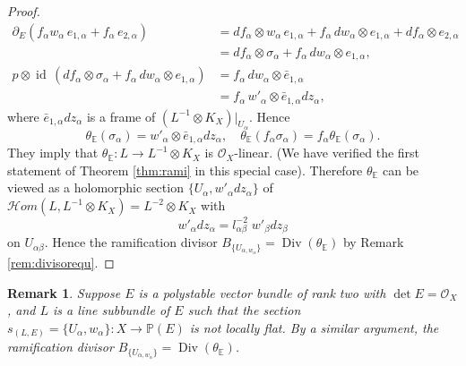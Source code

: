 \documentclass[12pt]{article}
\newtheorem{rem}{Remark}[section]
\begin{document}
\begin{proof}
\begin{align*}
\partial_{E} (f_{\alpha}w_{\alpha} \, e_{1, \alpha} + f_{\alpha} \, e_{2, \alpha}) &= df_{\alpha} \otimes w_{\alpha} \, e_{1, \alpha} + f_{\alpha} \, dw_{\alpha} \otimes e_{1, \alpha} + df_{\alpha} \otimes e_{2, \alpha} \\
 &= df_{\alpha} \otimes \sigma_{\alpha} + f_{\alpha} \, dw_{\alpha} \otimes e_{1, \alpha}, \\
p \otimes \operatorname{id}\, (df_{\alpha} \otimes \sigma_{\alpha} + f_{\alpha} \, dw_{\alpha} \otimes e_{1, \alpha}) &= f_{\alpha} \, dw_{\alpha} \otimes \bar{e}_{1, \alpha} \\
&=f_{\alpha} \, w'_{\alpha} \otimes \bar{e}_{1, \alpha} dz_{\alpha},
\end{align*}
where $\bar{e}_{1, \alpha}dz_{\alpha}$ is a frame of $(L^{-1}\otimes K_{X})|_{U_{\alpha}}$. Hence
\[ \theta_{\mathbb E}(\sigma_{\alpha}) = w'_{\alpha} \otimes \bar{e}_{1, \alpha}dz_{\alpha},\quad \theta_{\mathbb E}(f_{\alpha}\sigma_{\alpha}) =f_{\alpha} \theta_{\mathbb E}(\sigma_{\alpha}).  \]
They imply that $\theta_{\mathbb E} \colon L \rightarrow L^{-1}\otimes K_{X}$ is $\mathcal{O}_{X}$-linear. (We have verified the first statement of Theorem \ref{thm:rami} in this special case). Therefore $\theta_{\mathbb E}$ can be viewed as a holomorphic section $\{ U_{\alpha}, w'_{\alpha}dz_{\alpha} \}$ of $\mathcal{H}om(L, L^{-1}\otimes K_{X}) = L^{-2} \otimes K_{X}$ with
\[ w'_{\alpha}dz_{\alpha} = l_{\alpha \beta}^{-2} \; w'_{\beta}dz_{\beta} \]
on $U_{\alpha \beta}$. Hence the ramification divisor $B_{\{U_{\alpha, w_{\alpha}}\}} = \operatorname{Div}(\theta_{\mathbb E})$ by Remark \ref{rem:divisorequ}.
\end{proof}

\begin{rem} {\rm
\label{rem:polystablecase}
Suppose $E$ is a polystable vector bundle of rank two with $\det E = \mathcal O_{X}$, and $L$ is a line subbundle of $E$ such that the section $s_{(L, E)} = \{ U_{\alpha}, w_{\alpha} \} \colon X \to \mathbb P(E)$ is {\it not} locally flat. By a similar argument, the ramification divisor $B_{\{U_{\alpha, w_{\alpha}}\}} = \operatorname{Div}(\theta_{\mathbb E})$.
}\end{rem}
\end{document}
